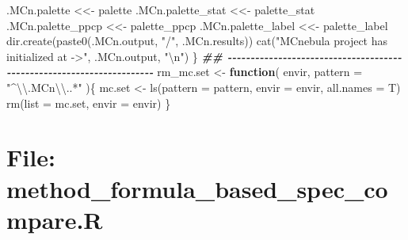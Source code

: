 \documentclass[
]{article}
\newenvironment{Shaded}{\begin{snugshade}}{\end{snugshade}}
\newcommand{\AttributeTok}[1]{\textcolor[rgb]{0.77,0.63,0.00}{#1}}
\newcommand{\ControlFlowTok}[1]{\textcolor[rgb]{0.13,0.29,0.53}{\textbf{#1}}}
\newcommand{\DocumentationTok}[1]{\textcolor[rgb]{0.56,0.35,0.01}{\textbf{\textit{#1}}}}
\newcommand{\FunctionTok}[1]{\textcolor[rgb]{0.00,0.00,0.00}{#1}}
\newcommand{\NormalTok}[1]{#1}
\newcommand{\OtherTok}[1]{\textcolor[rgb]{0.56,0.35,0.01}{#1}}
\newcommand{\SpecialCharTok}[1]{\textcolor[rgb]{0.00,0.00,0.00}{#1}}
\newcommand{\StringTok}[1]{\textcolor[rgb]{0.31,0.60,0.02}{#1}}
\begin{document}
\begin{Shaded}
\begin{Highlighting}[]
\NormalTok{    .MCn.palette }\OtherTok{\textless{}\textless{}{-}}\NormalTok{ palette}
\NormalTok{    .MCn.palette\_stat }\OtherTok{\textless{}\textless{}{-}}\NormalTok{ palette\_stat}
\NormalTok{    .MCn.palette\_ppcp }\OtherTok{\textless{}\textless{}{-}}\NormalTok{ palette\_ppcp}
\NormalTok{    .MCn.palette\_label }\OtherTok{\textless{}\textless{}{-}}\NormalTok{ palette\_label}
    \FunctionTok{dir.create}\NormalTok{(}\FunctionTok{paste0}\NormalTok{(.MCn.output, }\StringTok{"/"}\NormalTok{, .MCn.results))}
    \FunctionTok{cat}\NormalTok{(}\StringTok{"MCnebula project has initialized at {-}\textgreater{}"}\NormalTok{, .MCn.output, }\StringTok{"}\SpecialCharTok{\textbackslash{}n}\StringTok{"}\NormalTok{)}
\NormalTok{  \}}
\DocumentationTok{\#\# {-}{-}{-}{-}{-}{-}{-}{-}{-}{-}{-}{-}{-}{-}{-}{-}{-}{-}{-}{-}{-}{-}{-}{-}{-}{-}{-}{-}{-}{-}{-}{-}{-}{-}{-}{-}{-}{-}{-}{-}{-}{-}{-}{-}{-}{-}{-}{-}{-}{-}{-}{-}{-}{-}{-}{-}{-}{-}{-}{-}{-}{-}{-}{-}{-}{-}{-}{-}{-}{-} }
\NormalTok{rm\_mc.set }\OtherTok{\textless{}{-}} 
  \ControlFlowTok{function}\NormalTok{(}
\NormalTok{           envir,}
           \AttributeTok{pattern =} \StringTok{"\^{}}\SpecialCharTok{\textbackslash{}\textbackslash{}}\StringTok{.MCn}\SpecialCharTok{\textbackslash{}\textbackslash{}}\StringTok{..*"}
\NormalTok{           )\{}
\NormalTok{    mc.set }\OtherTok{\textless{}{-}} \FunctionTok{ls}\NormalTok{(}\AttributeTok{pattern =}\NormalTok{ pattern, }\AttributeTok{envir =}\NormalTok{ envir, }\AttributeTok{all.names =}\NormalTok{ T)}
    \FunctionTok{rm}\NormalTok{(}\AttributeTok{list =}\NormalTok{ mc.set, }\AttributeTok{envir =}\NormalTok{ envir)}
\NormalTok{  \}}
\end{Highlighting}
\end{Shaded}

\hypertarget{file-method_formula_based_spec_compare.r}{%
\section{File: method\_formula\_based\_spec\_compare.R}\label{file-method_formula_based_spec_compare.r}}
\end{document}
